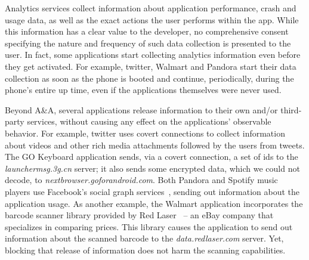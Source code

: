 Analytics services collect information about application performance, crash and usage data, as well as the exact actions the user performs within the app. 
While this information has a clear value to the developer, no comprehensive consent specifying the  nature and frequency of such data collection is presented to the user.
In fact, some applications start collecting analytics information even before they get activated. 
For example, twitter, Walmart and Pandora start their data collection as soon as the phone is booted and continue, periodically, during the phone's entire up time, even if the applications themselves were never used. 

Beyond A\&A, several applications release information to their own and/or third-party services, without  causing any effect on the applications' observable behavior. 
For example, twitter uses covert connections to collect information about videos and other rich media attachments followed by the users from tweets. 
The GO Keyboard application sends, via a covert connection, a set of ids to the \emph{launchermsg.3g.cn} server; it also sends some encrypted data, which we could not decode, to \emph{nextbrowser.goforandroid.com}. 
Both Pandora and Spotify music players use Facebook's social graph services~\cite{facebookSG}, sending out information about the application usage.
As another example, the Walmart application incorporates the barcode scanner library provided by 
Red Laser~\cite{redLaser} --
an eBay company that specializes in comparing prices. 
This library causes the application %
to send out information about the scanned barcode to the \emph{data.redlaser.com} server. 
Yet, blocking that release of information does not harm the scanning capabilities. 






